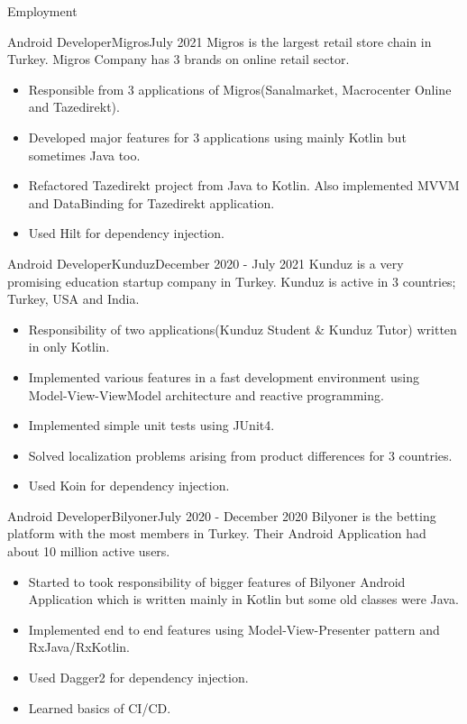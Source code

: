 \documentclass[]{mcdowellcv}
\begin{document}
	\makeheader
	
	\begin{cvsection}{Employment}
	
		\begin{cvsubsection}{Android Developer}{Migros}{July 2021}
		Migros is the largest retail store chain in Turkey. Migros Company has 3 brands on online retail sector.
			\begin{itemize}
				\item Responsible from 3 applications of Migros(Sanalmarket, Macrocenter Online and Tazedirekt).
				\item Developed major features for 3 applications using mainly Kotlin but sometimes Java too.
				\item Refactored Tazedirekt project from Java to Kotlin. Also implemented MVVM and DataBinding for Tazedirekt application.
				\item Used Hilt for dependency injection.
			\end{itemize}
		\end{cvsubsection}
		
		\begin{cvsubsection}{Android Developer}{Kunduz}{December 2020 - July 2021}
			Kunduz is a very promising education startup company in Turkey. Kunduz is active in 3 countries; Turkey, USA and India.		
			\begin{itemize}
				\item Responsibility of two applications(Kunduz Student \& Kunduz Tutor) written in only Kotlin.
				\item Implemented various features in a fast development environment using Model-View-ViewModel architecture and reactive programming. 
				\item Implemented simple unit tests using JUnit4.
				\item Solved localization problems arising from product differences for 3 countries.
				\item Used Koin for dependency injection.
			\end{itemize}
		\end{cvsubsection}
		
		\begin{cvsubsection}{Android Developer}{Bilyoner}{July 2020 - December 2020}
			Bilyoner is the betting platform with the most members in Turkey. Their Android Application had about 10 million active users.				
			\begin{itemize}
				\item Started to took responsibility of bigger features of Bilyoner Android Application which is written mainly in Kotlin but some old classes were Java.
				\item Implemented end to end features using Model-View-Presenter pattern and RxJava/RxKotlin.
				\item Used Dagger2 for dependency injection.
				\item Learned basics of CI/CD.
			\end{itemize}
		\end{cvsubsection}


\end{cvsection}
\end{document}
